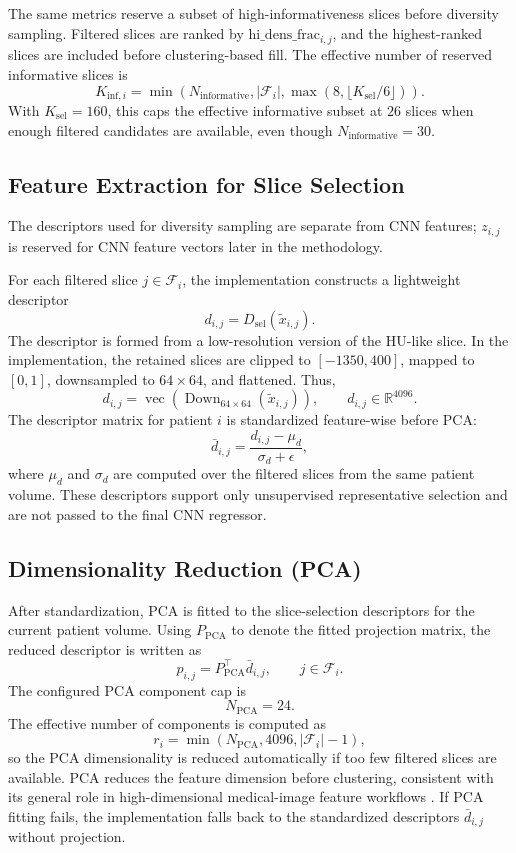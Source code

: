 The same metrics reserve a subset of high-informativeness slices before diversity sampling. Filtered slices are ranked by \(\mathrm{hi\_dens\_frac}_{i,j}\), and the highest-ranked slices are included before clustering-based fill. The effective number of reserved informative slices is
\[
K_{\mathrm{inf},i}
=
\min\!\left(
N_{\mathrm{informative}},
|\mathcal{F}_i|,
\max(8,\lfloor K_{\mathrm{sel}}/6 \rfloor)
\right).
\]
With \(K_{\mathrm{sel}}=160\), this caps the effective informative subset at \(26\) slices when enough filtered candidates are available, even though \(N_{\mathrm{informative}}=30\).


\subsection{Feature Extraction for Slice Selection}
\label{sec:feature_extraction_slice_selection}

The descriptors used for diversity sampling are separate from CNN features; \(z_{i,j}\) is reserved for CNN feature vectors later in the methodology.

For each filtered slice \(j \in \mathcal{F}_i\), the implementation constructs a lightweight descriptor
\[
d_{i,j}
=
D_{\mathrm{sel}}(\tilde{x}_{i,j}).
\]
The descriptor is formed from a low-resolution version of the HU-like slice. In the implementation, the retained slices are clipped to \([-1350,400]\), mapped to \([0,1]\), downsampled to \(64 \times 64\), and flattened. Thus,
\[
d_{i,j}
=
\operatorname{vec}\!\left(
\operatorname{Down}_{64 \times 64}(\tilde{x}_{i,j})
\right),
\qquad
d_{i,j} \in \mathbb{R}^{4096}.
\]
The descriptor matrix for patient \(i\) is standardized feature-wise before PCA:
\[
\bar{d}_{i,j}
=
\frac{d_{i,j} - \mu_d}{\sigma_d + \epsilon},
\]
where \(\mu_d\) and \(\sigma_d\) are computed over the filtered slices from the same patient volume. These descriptors support only unsupervised representative selection and are not passed to the final CNN regressor.


\subsection{Dimensionality Reduction (PCA)}
\label{sec:dimensionality_reduction_pca}

After standardization, PCA is fitted to the slice-selection descriptors for the current patient volume. Using \(P_{\mathrm{PCA}}\) to denote the fitted projection matrix, the reduced descriptor is written as
\[
p_{i,j}
=
P_{\mathrm{PCA}}^{\top}\bar{d}_{i,j},
\qquad j \in \mathcal{F}_i.
\]
The configured PCA component cap is
\[
N_{\mathrm{PCA}} = 24.
\]
The effective number of components is computed as
\[
r_i =
\min\!\left(
N_{\mathrm{PCA}},
4096,
|\mathcal{F}_i|-1
\right),
\]
so the PCA dimensionality is reduced automatically if too few filtered slices are available. PCA reduces the feature dimension before clustering, consistent with its general role in high-dimensional medical-image feature workflows \cite{mwangi2014feature}. If PCA fitting fails, the implementation falls back to the standardized descriptors \(\bar{d}_{i,j}\) without projection.


